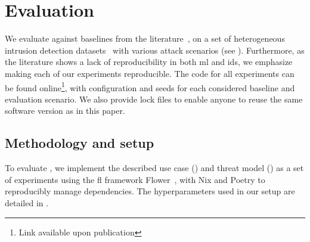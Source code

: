 \section{Evaluation}\label{sec:eval}

We evaluate \thecontrib against baselines from the literature~\cite{mcmahan_communication-efficient_2017,fung_limitations_2020}, on a set of heterogeneous intrusion detection datasets~\cite{sarhan_standardfeatureset_2021} with various attack scenarios (see ).
Furthermore, as the literature shows a lack of reproducibility in both \gls{ml} and \gls{ids}, we emphasize making each of our experiments reproducible.
The code for all experiments can be found online\footnote{Link available upon publication}, with configuration and seeds for each considered baseline and evaluation scenario. 
We also provide lock files to enable anyone to reuse the same software version as in this paper.

\subsection{Methodology and setup\label{sec:eval.methodo}}

To evaluate \thecontrib, we implement the described use case () and threat model () as a set of experiments using the \gls{fl} framework Flower~\cite{beutel_flower_2020}, with Nix and Poetry to reproducibly manage dependencies.
The hyperparameters used in our setup are detailed in .

